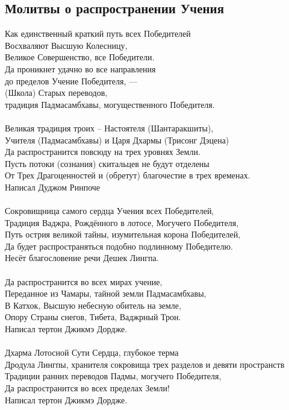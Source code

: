 \subsection{Молитвы о распространении Учения}

Как единственный краткий путь всех Победителей\\
Восхваляют Высшую Колесницу, \\ \indent Великое Совершенство, все Победители.\\
Да проникнет удачно во все направления \\ \indent до пределов Учение Победителя, —\\
(Школа) Старых переводов, \\ \indent традиция Падмасамбхавы, могущественного Победителя.\\
\\
Великая традиция троих – Настоятеля (Шантаракшиты),\\
Учителя (Падмасамбхавы) и Царя Дхармы (Трисонг Дэцена)\\
Да распространится повсюду на трех уровнях Земли.\\
Пусть потоки (сознания) скитальцев не будут отделены\\
От Трех Драгоценностей и (обретут) благочестие в трех временах.\\
Написал Дуджом Ринпоче\\
\\
Сокровищница самого сердца Учения всех Победителей,\\
Традиция Ваджра, Рождённого в лотосе, Могучего Победителя,\\
Путь острия великой тайны, изумительная корона Победителей,\\
Да будет распространяться подобно подлинному Победителю.\\
Несёт благословение речи Дешек Лингпа.\\
\\
Да распространится во всех мирах учение,\\
Переданное из Чамары, тайной земли Падмасамбхавы,\\
В Катхок, Высшую небесную обитель на земле,\\
Опору Страны снегов, Тибета, Ваджрный Трон.\\
Написал тертон Джикмэ Дордже.\\
\\
Дхарма Лотосной Сути Сердца, глубокое терма\\
Дродула Лингпы, хранителя сокровища трех разделов и девяти пространств\\
Традиции ранних переводов Падмы, могучего Победителя,\\
Да распространится во всех пределах Земли!\\
Написал тертон Джикмэ Дордже.\\
\\

